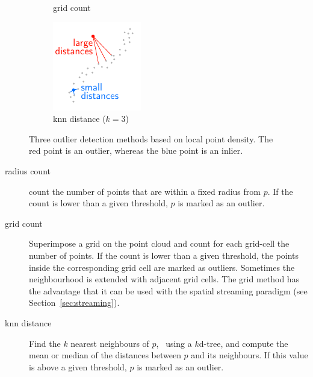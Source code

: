 \begin{figure}[htb]
\begin{subfigure}[b]{0.3\linewidth}
    \caption{grid count}
  \end{subfigure}
  \begin{subfigure}[b]{0.3\linewidth}
    \centering
    \includegraphics[width=\textwidth]{figs/knn-distance.pdf}
    \caption{knn distance ($k=3$)}
  \end{subfigure}
\caption{Three outlier detection methods based on local point density. The red point is an outlier, whereas the blue point is an inlier.}%
\label{fig:outlier-detection}
\end{figure}

\begin{description}
  \item[radius count] count the number of points that are within a fixed radius from $p$. If the count is lower than a given threshold, $p$ is marked as an outlier.
  \item[grid count] Superimpose a grid on the point cloud and count for each grid-cell the number of points. If the count is lower than a given threshold, the points inside the corresponding grid cell are marked as outliers. Sometimes the neighbourhood is extended with adjacent grid cells. The grid method has the advantage that it can be used with the spatial streaming paradigm (see Section~\ref{sec:streaming}).
  \item[knn distance] Find the $k$ nearest neighbours of $p$, \eg\ using a $k$d-tree, and compute the mean or median of the distances between $p$ and its neighbours. If this value is above a given threshold, $p$ is marked as an outlier.
\end{description}

